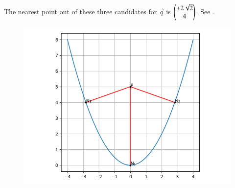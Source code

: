     The nearest point out of these three candidates for $\vec{q}$ is
    $\begin{pmatrix}\pm2\sqrt{2}\\4\end{pmatrix}$. 
See .
\begin{figure}[!ht]
        \centering
        \includegraphics[width=\columnwidth]{chapters/12/6/5/27/figs/normal.png}
        \caption{}
        \label{fig:chapters/12/6/5/27/normal}
    \end{figure}

